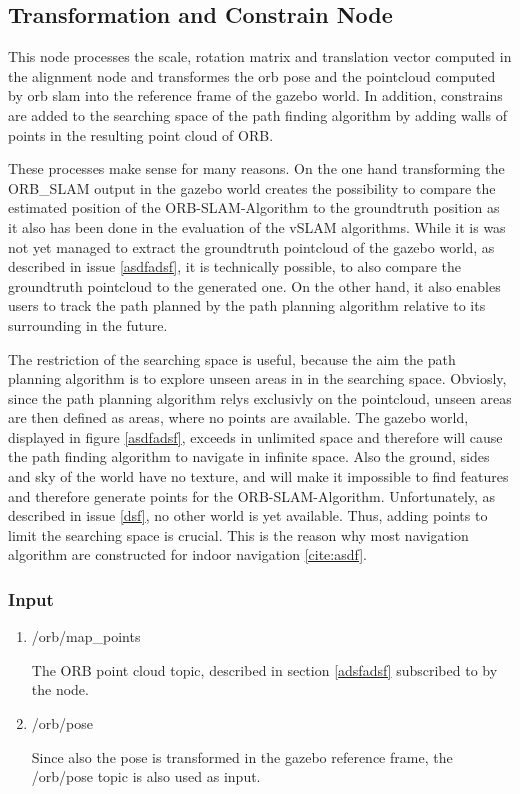 	
	\subsection{Transformation and Constrain Node}
	
	This node processes the scale, rotation matrix and translation vector computed in the alignment node and transformes the orb pose and the pointcloud computed 
	by orb slam into the reference frame of the gazebo world. In addition, constrains are added to the searching space of the path finding algorithm by adding 
	walls of points in the resulting point cloud of ORB. 
	
	These processes make sense for many reasons. On the one hand transforming the ORB\_SLAM output in the gazebo world creates the possibility to compare the 
	estimated position of the ORB-SLAM-Algorithm to the groundtruth position as it also has been done in the evaluation of the vSLAM algorithms. While it is 
	was not yet managed to extract the groundtruth pointcloud of the gazebo world, as described in issue \ref{asdfadsf}, it is technically possible, to also 
	compare the groundtruth pointcloud to the generated one. On the other hand, it also enables users to track the path planned by the path planning algorithm relative
	to its surrounding in the future. 
	
	The restriction of the searching space is useful, because the aim the path planning algorithm is to explore unseen areas in in the searching space. Obviosly, 
	since the path planning algorithm relys exclusivly on the pointcloud, unseen areas are then defined as areas, where no points are available. The gazebo world, 
	displayed in figure \ref{asdfadsf}, exceeds in unlimited space and therefore will cause the path finding algorithm to navigate in infinite space. Also the ground, sides and 
	sky of the world have no texture, and will make it impossible to find features and therefore generate points for the ORB-SLAM-Algorithm. Unfortunately, 
	as described in issue \ref{dsf}, no other world is yet available. Thus, adding points to 
	limit the searching space is crucial. This is the reason why most navigation algorithm are constructed for indoor navigation \ref{cite:asdf}. 
	
	\subsubsection{Input}
	
	\begin{enumerate}
	\item{/orb/map\_points}
	
	The ORB point cloud topic, described in section \ref{adsfadsf} subscribed to by the node. 
	
	\item{/orb/pose}
	
	Since also the pose is transformed in the gazebo reference frame, the /orb/pose topic is also used as input. 
	
	\end{enumerate}
	
